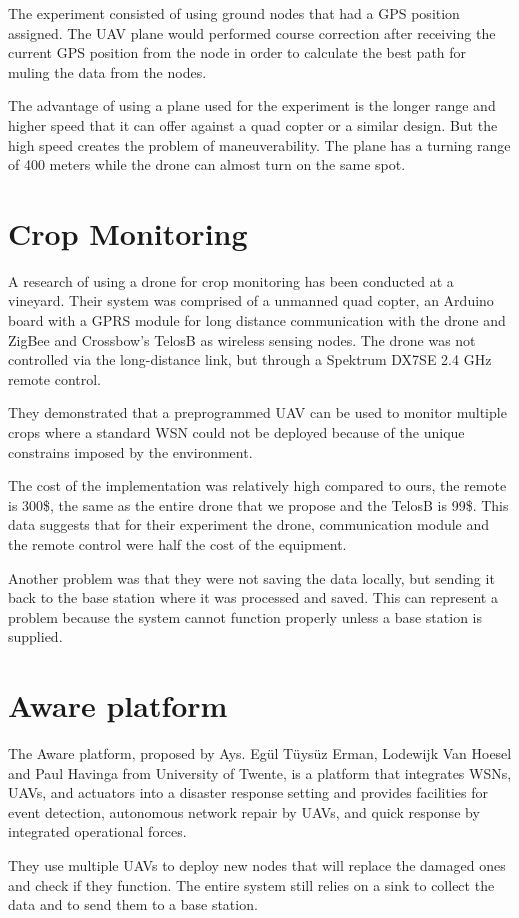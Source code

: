 The experiment consisted of using ground nodes that had a GPS position assigned. The UAV plane would performed course correction after receiving the current GPS position from the node in order to calculate the best path for muling the data from the nodes.

The advantage of using a plane used for the experiment is the longer range and higher speed that it can offer against a quad copter or a similar design.  But the high speed creates the problem of maneuverability. The plane has a turning range of 400 meters while the drone can almost turn on the same spot.

\section{Crop Monitoring} \cite{valente2011air}

A research of using a drone for crop monitoring has been conducted at a vineyard. Their system was comprised of a unmanned quad copter, an Arduino board with a GPRS module for long distance communication with  the drone and ZigBee and Crossbow’s TelosB as wireless sensing nodes. The drone was not controlled via the long-distance link, but through a Spektrum DX7SE 2.4 GHz remote control.

They demonstrated that a preprogrammed UAV can be used to monitor multiple crops where a standard WSN could not be deployed because of the unique constrains imposed by the environment.

The cost of the implementation was relatively high compared to ours, the remote is 300\$, the same as the entire drone that we propose and the TelosB is 99\$. This data suggests that for their experiment the drone, communication module and the remote control were half the cost of the equipment.

Another problem was that they were not saving the data locally, but sending it back to the base station where it was processed and saved. This can represent a problem because the system cannot function properly unless a base station is supplied.

\section{Aware platform}\cite{ollero2007aware}

The Aware platform, proposed by Ays. Egül Tüysüz Erman, Lodewijk Van Hoesel and Paul Havinga from University of Twente, is a platform that integrates WSNs, UAVs, and actuators into a disaster response setting and provides facilities for event detection, autonomous network repair by UAVs, and quick response by integrated operational forces.

They use multiple UAVs to deploy new nodes that will replace the damaged ones and check if they function. The entire system still relies on a sink to collect the data and to send them to a base station.\cite{erman2008enabling}
